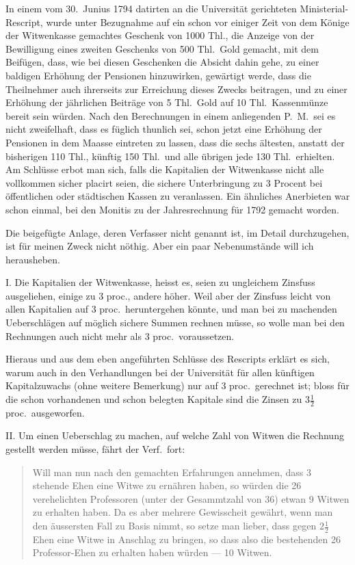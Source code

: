 \documentclass[12pt,a4paper]{article}
\begin{document}
In einem vom 30.\ Junius 1794 datirten an die Universit\"at gerichteten Ministerial-Rescript, wurde unter Bezugnahme auf ein schon vor einiger Zeit von dem K\"onige der Witwenkasse gemachtes Geschenk von 1000 Thl., die Anzeige von der Bewilligung eines zweiten Geschenks von 500 Thl.\ Gold gemacht, mit dem Beif\"ugen, dass, wie bei diesen Geschenken die Absicht dahin gehe, zu einer baldigen Erh\"ohung der Pensionen hinzuwirken, gew\"artigt werde, dass die Theilnehmer auch ihrerseits zur Erreichung dieses Zwecks beitragen, und zu einer Erh\"ohung der j\"ahrlichen Beitr\"age von 5 Thl.\ Gold auf 10 Thl.\ Kassenm\"unze bereit sein w\"urden. Nach den Berechnungen in einem anliegenden P.\ M.\ sei es nicht zweifelhaft, dass es f\"uglich thunlich sei, schon jetzt eine Erh\"ohung der Pensionen in dem Maasse eintreten zu lassen, dass die sechs \"altesten, anstatt der bisherigen 110 Thl., k\"unftig 150 Thl.\ und alle \"ubrigen jede 130 Thl.\ erhielten. Am Schl\"usse erbot man sich, falls die Kapitalien der Witwenkasse nicht alle vollkommen sicher placirt seien, die sichere Unterbringung zu 3 Procent bei \"offentlichen oder st\"adtischen Kassen zu veranlassen. Ein \"ahnliches Anerbieten war schon einmal, bei den Monitis zu der Jahresrechnung f\"ur 1792 gemacht worden.

Die beigef\"ugte Anlage, deren Verfasser nicht genannt ist, im Detail durchzugehen, ist f\"ur meinen Zweck nicht n\"othig. Aber ein paar Nebenumst\"ande will ich herausheben.

I. Die Kapitalien der Witwenkasse, heisst es, seien zu ungleichem Zinsfuss ausgeliehen, einige zu 3 proc., andere h\"oher. Weil aber der Zinsfuss leicht von allen Kapitalien auf 3 proc.\ heruntergehen k\"onnte, und man bei zu machenden Ueberschl\"agen auf m\"oglich sichere Summen rechnen m\"usse, so wolle man bei den Rechnungen auch nicht mehr als 3 proc.\ voraussetzen.

Hieraus und aus dem eben angef\"uhrten Schl\"usse des Rescripts erkl\"art es sich, warum auch in den Verhandlungen bei der Universit\"at f\"ur allen k\"unftigen Kapitalzuwachs (ohne weitere Bemerkung) nur auf 3 proc.\ gerechnet ist; bloss f\"ur die schon vorhandenen und schon belegten Kapitale sind die Zinsen zu $3\frac{1}{2}$ proc.\ ausgeworfen.

II. Um einen Ueberschlag zu machen, auf welche Zahl von Witwen die Rechnung gestellt werden m\"usse, f\"ahrt der Verf.\ fort:

\begin{quote}
Will man nun nach den gemachten Erfahrungen annehmen, dass 3 stehende Ehen eine Witwe zu ern\"ahren haben, so w\"urden die 26 verehelichten Professoren (unter der Gesammtzahl von 36) etwan 9 Witwen zu erhalten haben. Da es aber mehrere Gewisscheit gew\"ahrt, wenn man den \"aussersten Fall zu Basis nimmt, so setze man lieber, dass gegen $2\frac{1}{2}$ Ehen eine Witwe in Anschlag zu bringen, so dass also die bestehenden 26 Professor-Ehen zu erhalten haben w\"urden --- 10 Witwen.
\end{quote}
\end{document}
